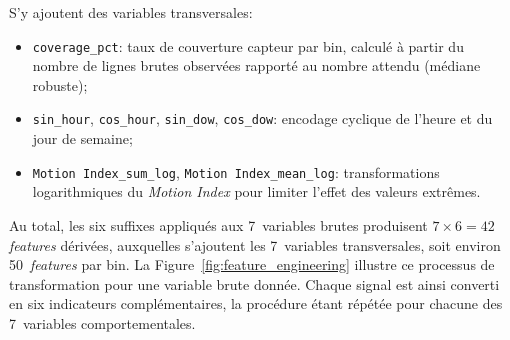 \noindent
S'y ajoutent des variables transversales:
\begin{itemize}
    \item \texttt{coverage\_pct}: taux de couverture capteur par bin, calculé à partir du
    nombre de lignes brutes observées rapporté au nombre attendu (médiane robuste);
    \item \texttt{sin\_hour}, \texttt{cos\_hour}, \texttt{sin\_dow}, \texttt{cos\_dow}:
    encodage cyclique de l'heure et du jour de semaine;
    \item \texttt{Motion Index\_sum\_log}, \texttt{Motion Index\_mean\_log}: transformations
    logarithmiques du \textit{Motion Index} pour limiter l'effet des valeurs extrêmes.
\end{itemize}

Au total, les six suffixes appliqués aux 7~variables brutes produisent $7 \times 6 = 42$
\textit{features} dérivées, auxquelles s'ajoutent les 7~variables transversales, soit environ
50~\textit{features} par bin. La Figure~\ref{fig:feature_engineering} illustre ce processus de
transformation pour une variable brute donnée. Chaque signal est ainsi converti en six
indicateurs complémentaires, la procédure étant répétée pour chacune des 7~variables
comportementales.

